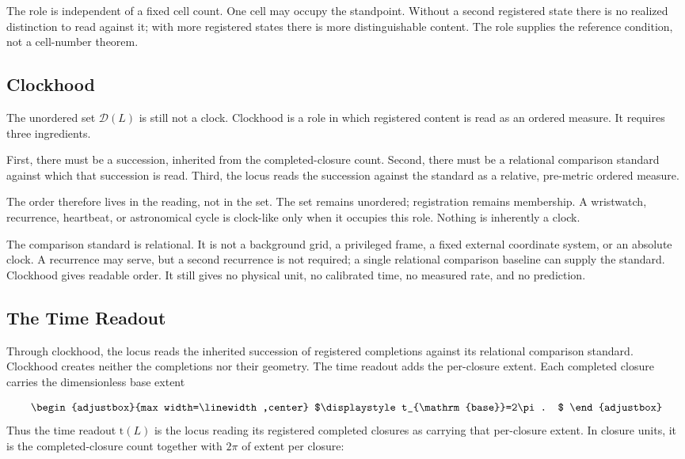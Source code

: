 The role is independent of a fixed cell count. One cell may occupy the standpoint. Without a second registered state there is no realized distinction to read against it; with more registered states there is more distinguishable content. The role supplies the reference condition, not a cell-number theorem.

\subsection{Clockhood}
The unordered set \(\mathcal{D}(L)\) is still not a clock. Clockhood is a role in which registered content is read as an ordered measure. It requires three ingredients.

First, there must be a succession, inherited from the completed-closure count. Second, there must be a relational comparison standard against which that succession is read. Third, the locus reads the succession against the standard as a relative, pre-metric ordered measure.

The order therefore lives in the reading, not in the set. The set remains unordered; registration remains membership. A wristwatch, recurrence, heartbeat, or astronomical cycle is clock-like only when it occupies this role. Nothing is inherently a clock.

The comparison standard is relational. It is not a background grid, a privileged frame, a fixed external coordinate system, or an absolute clock. A recurrence may serve, but a second recurrence is not required; a single relational comparison baseline can supply the standard. Clockhood gives readable order. It still gives no physical unit, no calibrated time, no measured rate, and no prediction.

\subsection{The Time Readout}
Through clockhood, the locus reads the inherited succession of registered completions against its relational comparison standard. Clockhood creates neither the completions nor their geometry. The time readout adds the per-closure extent. Each completed closure carries the dimensionless base extent

\begin{equation*}
\begin{adjustbox}{max width=\linewidth,center}
$\displaystyle
t_{\mathrm{base}}=2\pi .
$
\end{adjustbox}
\end{equation*}
Thus the time readout \(\mathrm{t}(L)\) is the locus reading its registered completed closures as carrying that per-closure extent. In closure units, it is the completed-closure count together with \(2\pi\) of extent per closure:

